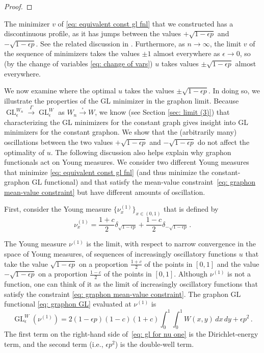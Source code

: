 \documentclass[11pt]{amsart}
\def\ep{\epsilon}
\def\ra{\rightarrow}
\def\gamra{\stackrel{\Gamma}{\longrightarrow}}
\def\sqra{\stackrel{\square}{\longrightarrow}}
\def\GL{\operatorname{GL}}
\numberwithin{equation}{section}
\begin{document}
{\begin{proof}
\end{proof}

The minimizer $v$ of \eqref{eq: equivalent const gl fnl} that we constructed has a discontinuous profile, as it has jumps between the values $+ \sqrt{1 - \ep p}$ and $-\sqrt{1 - \ep p}$. See the related discussion in \cite{du2016asymptotically}.
Furthermore, as $n \ra \infty$, the limit $v$ of the sequence of minimizers takes the values $\pm 1$ almost everywhere as $\ep \ra 0$, so (by the change of variables \eqref{eq: change of vars}) $u$ takes values $\pm \sqrt{1 - \ep p}$ almost everywhere.  

We now examine where the optimal $u$ takes the values $\pm \sqrt{1 - \ep p}$. In doing so, we illustrate the properties of the GL minimizer in the graphon limit. Because $\GL^{W_n}_\ep \gamra \GL^W_\ep$ as $W_n \sqra W$, we know (see Section \ref{sec: limit (3)}) that characterizing the GL minimizers for the constant graph gives insight into GL minimizers for the constant graphon.
We show that the (arbitrarily many) oscillations between the two values $+\sqrt{1 - \ep p}$ and $-\sqrt{1 - \ep p}$ do not affect the optimality of $u$. The following discussion also helps explain why graphon functionals act on Young measures. We consider two different Young measures that minimize \eqref{eq: equivalent const gl fnl} (and thus minimize the constant-graphon GL functional) and that satisfy the mean-value constraint~\eqref{eq: graphon mean-value constraint} but have different amounts of oscillation.

First, consider the Young measure $\{\nu^{(1)}_x\}_{x\in (0,1)}$ that is defined by
\begin{equation}
\label{eq: const ym minimizer}
    \nu^{(1)}_x =  \frac{1 + c}{2} \delta_{\sqrt{1 - \ep p}} + \frac{1 - c}{2} \delta_{-\sqrt{1 - \ep p}} \,. 
\end{equation}

The Young measure $\nu^{(1)}$ is the limit, with respect to narrow convergence in the space of Young measures, of sequences of increasingly oscillatory functions $u$ that take the value $\sqrt{1 - \ep p}$ on a proportion $\frac{1 + c}{2}$ of the points in $[0,1]$ and the value $-\sqrt{1 - \ep p}$ on a proportion $\frac{1 - c}{2}$ of the points in $[0,1]$. 
Although $\nu^{(1)}$ is not a function, one can think of it as the limit of increasingly oscillatory functions that satisfy the constraint \eqref{eq: graphon mean-value constraint}. 
The graphon GL functional \eqref{eq: graphon GL} evaluated {at} $\nu^{(1)}$ is 
\begin{equation} \label{eq: gl for nu one}
    {\GL^W_\ep(\nu^{(1)}) = 2 {(1 - \ep p)} (1 - c)(1 + c) \int_0^1 \int_0^1 W(x,y) \,dx \, dy   + \ep p^2} \,. 
\end{equation}
The first term on the right-hand side of~\eqref{eq: gl for nu one} is the Dirichlet-energy term, and the second term (i.e., $\ep p^2$) is the double-well term. 


}
\end{document}
